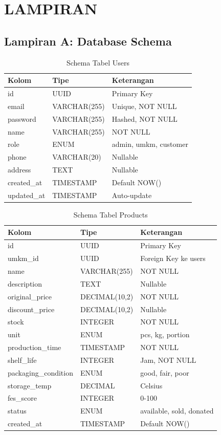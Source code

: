 \section*{LAMPIRAN}
{}

\subsection*{Lampiran A: Database Schema}
{}

\begin{table}[H]
\centering
\caption{Schema Tabel Users}
\label{tab:schema_users}
\begin{tabular}{|l|l|p{}|}
\hline
\textbf{Kolom} & \textbf{Tipe} & \textbf{Keterangan} \\
\hline
id & UUID & Primary Key \\
email & VARCHAR(255) & Unique, NOT NULL \\
password & VARCHAR(255) & Hashed, NOT NULL \\
name & VARCHAR(255) & NOT NULL \\
role & ENUM & admin, umkm, customer \\
phone & VARCHAR(20) & Nullable \\
address & TEXT & Nullable \\
created\_at & TIMESTAMP & Default NOW() \\
updated\_at & TIMESTAMP & Auto-update \\
\hline
\end{tabular}
\end{table}

\begin{table}[H]
\centering
\caption{Schema Tabel Products}
\label{tab:schema_products}
\begin{tabular}{|l|l|p{}|}
\hline
\textbf{Kolom} & \textbf{Tipe} & \textbf{Keterangan} \\
\hline
id & UUID & Primary Key \\
umkm\_id & UUID & Foreign Key ke users \\
name & VARCHAR(255) & NOT NULL \\
description & TEXT & Nullable \\
original\_price & DECIMAL(10,2) & NOT NULL \\
discount\_price & DECIMAL(10,2) & Nullable \\
stock & INTEGER & NOT NULL \\
unit & ENUM & pcs, kg, portion \\
production\_time & TIMESTAMP & NOT NULL \\
shelf\_life & INTEGER & Jam, NOT NULL \\
packaging\_condition & ENUM & good, fair, poor \\
storage\_temp & DECIMAL & Celsius \\
fes\_score & INTEGER & 0-100 \\
status & ENUM & available, sold, donated \\
created\_at & TIMESTAMP & Default NOW() \\
\hline
\end{tabular}
\end{table}